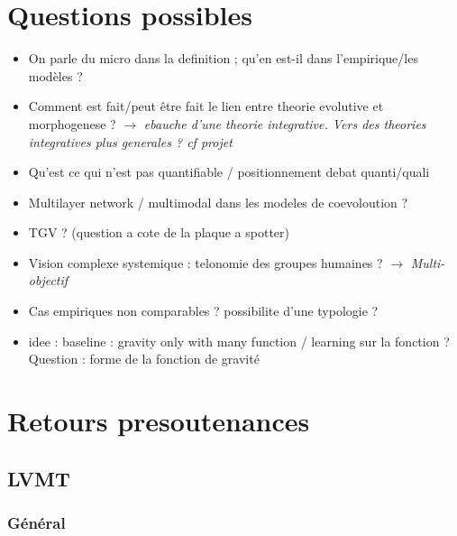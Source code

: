 \documentclass[11pt]{article}
\begin{document}
\section*{Questions possibles}

\begin{itemize}
	\item On parle du micro dans la definition ; qu'en est-il dans l'empirique/les modèles ?
	\item Comment est fait/peut être fait le lien entre theorie evolutive et morphogenese ? $\rightarrow$ \textit{ebauche d'une theorie integrative. Vers des theories integratives plus generales ? cf projet}
	\item Qu'est ce qui n'est pas quantifiable / positionnement debat quanti/quali
	\item Multilayer network / multimodal dans les modeles de coevoloution ?
	\item TGV ? (question a cote de la plaque a spotter)
	\item Vision complexe systemique : telonomie des groupes humaines ? $\rightarrow$ \textit{Multi-objectif}
	\item Cas empiriques non comparables ? possibilite d'une typologie ?
	\item idee : baseline : gravity only with many function / learning sur la fonction ? Question : forme de la fonction de gravité
\end{itemize}






\section*{Retours presoutenances}


\subsection*{LVMT}

\subsubsection*{Général}
\end{document}

